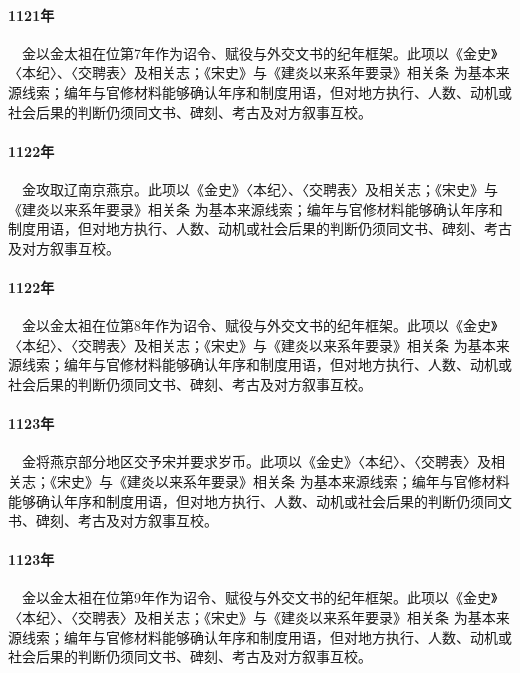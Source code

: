 \paragraph{1121年}　金以金太祖在位第7年作为诏令、赋役与外交文书的纪年框架。此项以《金史》〈本纪〉、〈交聘表〉及相关志；《宋史》与《建炎以来系年要录》相关条 为基本来源线索；编年与官修材料能够确认年序和制度用语，但对地方执行、人数、动机或社会后果的判断仍须同文书、碑刻、考古及对方叙事互校。

\paragraph{1122年}　金攻取辽南京燕京。此项以《金史》〈本纪〉、〈交聘表〉及相关志；《宋史》与《建炎以来系年要录》相关条 为基本来源线索；编年与官修材料能够确认年序和制度用语，但对地方执行、人数、动机或社会后果的判断仍须同文书、碑刻、考古及对方叙事互校。

\paragraph{1122年}　金以金太祖在位第8年作为诏令、赋役与外交文书的纪年框架。此项以《金史》〈本纪〉、〈交聘表〉及相关志；《宋史》与《建炎以来系年要录》相关条 为基本来源线索；编年与官修材料能够确认年序和制度用语，但对地方执行、人数、动机或社会后果的判断仍须同文书、碑刻、考古及对方叙事互校。

\paragraph{1123年}　金将燕京部分地区交予宋并要求岁币。此项以《金史》〈本纪〉、〈交聘表〉及相关志；《宋史》与《建炎以来系年要录》相关条 为基本来源线索；编年与官修材料能够确认年序和制度用语，但对地方执行、人数、动机或社会后果的判断仍须同文书、碑刻、考古及对方叙事互校。

\paragraph{1123年}　金以金太祖在位第9年作为诏令、赋役与外交文书的纪年框架。此项以《金史》〈本纪〉、〈交聘表〉及相关志；《宋史》与《建炎以来系年要录》相关条 为基本来源线索；编年与官修材料能够确认年序和制度用语，但对地方执行、人数、动机或社会后果的判断仍须同文书、碑刻、考古及对方叙事互校。

